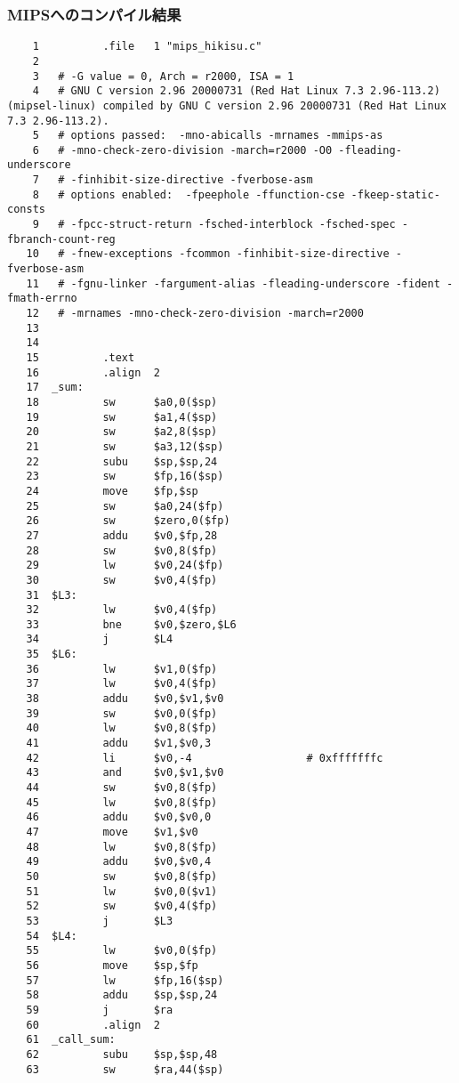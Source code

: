 \documentclass[a4j,11pt]{jarticle}
\begin{document}
  \subsubsection{MIPSへのコンパイル結果}
  \begin{verbatim}
    1          .file   1 "mips_hikisu.c"
    2
    3   # -G value = 0, Arch = r2000, ISA = 1
    4   # GNU C version 2.96 20000731 (Red Hat Linux 7.3 2.96-113.2) 
(mipsel-linux) compiled by GNU C version 2.96 20000731 (Red Hat Linux 7.3 2.96-113.2).       
    5   # options passed:  -mno-abicalls -mrnames -mmips-as
    6   # -mno-check-zero-division -march=r2000 -O0 -fleading-underscore
    7   # -finhibit-size-directive -fverbose-asm
    8   # options enabled:  -fpeephole -ffunction-cse -fkeep-static-consts
    9   # -fpcc-struct-return -fsched-interblock -fsched-spec -fbranch-count-reg
   10   # -fnew-exceptions -fcommon -finhibit-size-directive -fverbose-asm
   11   # -fgnu-linker -fargument-alias -fleading-underscore -fident -fmath-errno
   12   # -mrnames -mno-check-zero-division -march=r2000
   13
   14
   15          .text
   16          .align  2
   17  _sum:
   18          sw      $a0,0($sp)
   19          sw      $a1,4($sp)
   20          sw      $a2,8($sp)
   21          sw      $a3,12($sp)
   22          subu    $sp,$sp,24
   23          sw      $fp,16($sp)
   24          move    $fp,$sp
   25          sw      $a0,24($fp)
   26          sw      $zero,0($fp)
   27          addu    $v0,$fp,28
   28          sw      $v0,8($fp)
   29          lw      $v0,24($fp)
   30          sw      $v0,4($fp)
   31  $L3:
   32          lw      $v0,4($fp)
   33          bne     $v0,$zero,$L6
   34          j       $L4
   35  $L6:
   36          lw      $v1,0($fp)
   37          lw      $v0,4($fp)
   38          addu    $v0,$v1,$v0
   39          sw      $v0,0($fp)
   40          lw      $v0,8($fp)
   41          addu    $v1,$v0,3
   42          li      $v0,-4                  # 0xfffffffc
   43          and     $v0,$v1,$v0
   44          sw      $v0,8($fp)
   45          lw      $v0,8($fp)
   46          addu    $v0,$v0,0
   47          move    $v1,$v0
   48          lw      $v0,8($fp)
   49          addu    $v0,$v0,4
   50          sw      $v0,8($fp)
   51          lw      $v0,0($v1)
   52          sw      $v0,4($fp)
   53          j       $L3
   54  $L4:
   55          lw      $v0,0($fp)
   56          move    $sp,$fp
   57          lw      $fp,16($sp)
   58          addu    $sp,$sp,24
   59          j       $ra
   60          .align  2
   61  _call_sum:
   62          subu    $sp,$sp,48
   63          sw      $ra,44($sp)

\end{verbatim}
\end{document}
